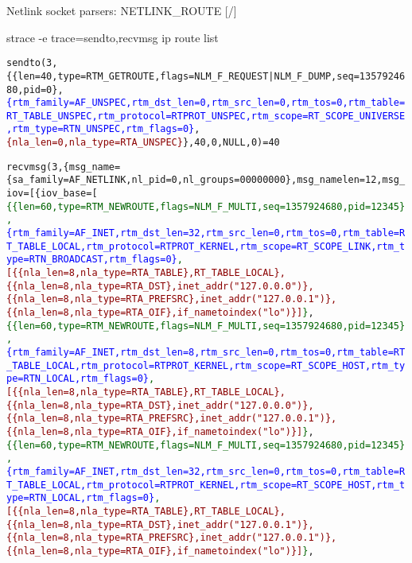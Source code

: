 \documentclass[unicode,aspectratio=169,xcolor={table,dvipsnames,usernames}]{beamer}
\begin{document}
\begin{frame}{Netlink socket parsers: NETLINK\_ROUTE \hfill [\insertframenumber/\inserttotalframenumber]}
\tiny
\begin{block}{\large strace -e trace=sendto,recvmsg ip route list}
\begin{alltt}
sendto(3, \{\{len=40, type=RTM\_GETROUTE, flags=NLM\_F\_REQUEST|NLM\_F\_DUMP, seq=1357924680, pid=0\},
 \textcolor{blue}{\{rtm\_family=AF\_UNSPEC, rtm\_dst\_len=0, rtm\_src\_len=0, rtm\_tos=0, rtm\_table=RT\_TABLE\_UNSPEC, rtm\_protocol=RTPROT\_UNSPEC, rtm\_scope=RT\_SCOPE\_UNIVERSE, rtm\_type=RTN\_UNSPEC, rtm\_flags=0\}},
  \textcolor{darkred}{\{nla\_len=0, nla\_type=RTA\_UNSPEC\}}\}, 40, 0, NULL, 0) = 40

\smallskip
recvmsg(3, \{msg\_name=\{sa\_family=AF\_NETLINK, nl\_pid=0, nl\_groups=00000000\}, msg\_namelen=12, msg\_iov=[\{iov\_base=[
\textcolor{darkgreen}{\{\{len=60, type=RTM\_NEWROUTE, flags=NLM\_F\_MULTI, seq=1357924680, pid=12345\},
 \textcolor{blue}{\{rtm\_family=AF\_INET, rtm\_dst\_len=32, rtm\_src\_len=0, rtm\_tos=0, rtm\_table=RT\_TABLE\_LOCAL, rtm\_protocol=RTPROT\_KERNEL, rtm\_scope=RT\_SCOPE\_LINK, rtm\_type=RTN\_BROADCAST, rtm\_flags=0\}},
  \textcolor{darkred}{[\{\{nla\_len=8, nla\_type=RTA\_TABLE\}, RT\_TABLE\_LOCAL\}, \{\{nla\_len=8, nla\_type=RTA\_DST\}, inet\_addr("127.0.0.0")\}, \{\{nla\_len=8, nla\_type=RTA\_PREFSRC\}, inet\_addr("127.0.0.1")\}, \{\{nla\_len=8, nla\_type=RTA\_OIF\}, if\_nametoindex("lo")\}]}\}},
\textcolor{darkgreen}{\{\{len=60, type=RTM\_NEWROUTE, flags=NLM\_F\_MULTI, seq=1357924680, pid=12345\},
 \textcolor{blue}{\{rtm\_family=AF\_INET, rtm\_dst\_len=8, rtm\_src\_len=0, rtm\_tos=0, rtm\_table=RT\_TABLE\_LOCAL, rtm\_protocol=RTPROT\_KERNEL, rtm\_scope=RT\_SCOPE\_HOST, rtm\_type=RTN\_LOCAL, rtm\_flags=0\}},
  \textcolor{darkred}{[\{\{nla\_len=8, nla\_type=RTA\_TABLE\}, RT\_TABLE\_LOCAL\}, \{\{nla\_len=8, nla\_type=RTA\_DST\}, inet\_addr("127.0.0.0")\}, \{\{nla\_len=8, nla\_type=RTA\_PREFSRC\}, inet\_addr("127.0.0.1")\}, \{\{nla\_len=8, nla\_type=RTA\_OIF\}, if\_nametoindex("lo")\}]}\}},
\textcolor{darkgreen}{\{\{len=60, type=RTM\_NEWROUTE, flags=NLM\_F\_MULTI, seq=1357924680, pid=12345\},
 \textcolor{blue}{\{rtm\_family=AF\_INET, rtm\_dst\_len=32, rtm\_src\_len=0, rtm\_tos=0, rtm\_table=RT\_TABLE\_LOCAL, rtm\_protocol=RTPROT\_KERNEL, rtm\_scope=RT\_SCOPE\_HOST, rtm\_type=RTN\_LOCAL, rtm\_flags=0\}},
  \textcolor{darkred}{[\{\{nla\_len=8, nla\_type=RTA\_TABLE\}, RT\_TABLE\_LOCAL\}, \{\{nla\_len=8, nla\_type=RTA\_DST\}, inet\_addr("127.0.0.1")\}, \{\{nla\_len=8, nla\_type=RTA\_PREFSRC\}, inet\_addr("127.0.0.1")\}, \{\{nla\_len=8, nla\_type=RTA\_OIF\}, if\_nametoindex("lo")\}]}\}},

\end{alltt}
\end{block}
\end{frame}
\end{document}
